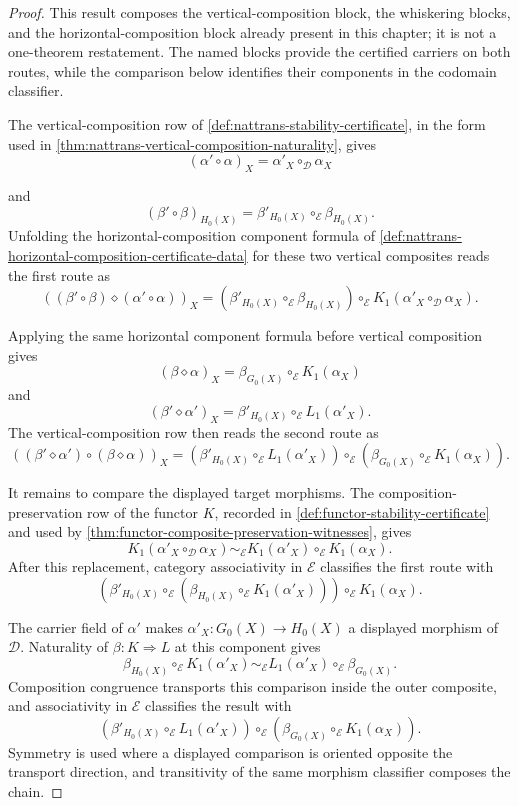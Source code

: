 \begin{proof}
This result composes the vertical-composition block, the whiskering blocks, and the horizontal-composition block already present in this chapter; it is not a one-theorem restatement. The named blocks provide the certified carriers on both routes, while the comparison below identifies their components in the codomain classifier.

The vertical-composition row of \autoref{def:nattrans-stability-certificate}, in the form used in \autoref{thm:nattrans-vertical-composition-naturality}, gives
$$
(\alpha'\circ\alpha)_X=\alpha'_X\circ_{\mathcal D}\alpha_X
$$

and
$$
(\beta'\circ\beta)_{H_0(X)}=\beta'_{H_0(X)}\circ_{\mathcal E}\beta_{H_0(X)}.
$$
Unfolding the horizontal-composition component formula of \autoref{def:nattrans-horizontal-composition-certificate-data} for these two vertical composites reads the first route as
$$
((\beta'\circ\beta)\diamond(\alpha'\circ\alpha))_X
=
(\beta'_{H_0(X)}\circ_{\mathcal E}\beta_{H_0(X)})\circ_{\mathcal E}K_1(\alpha'_X\circ_{\mathcal D}\alpha_X).
$$

Applying the same horizontal component formula before vertical composition gives
$$
(\beta\diamond\alpha)_X=\beta_{G_0(X)}\circ_{\mathcal E}K_1(\alpha_X)
$$
and
$$
(\beta'\diamond\alpha')_X=\beta'_{H_0(X)}\circ_{\mathcal E}L_1(\alpha'_X).
$$
The vertical-composition row then reads the second route as
$$
((\beta'\diamond\alpha')\circ(\beta\diamond\alpha))_X
=
(\beta'_{H_0(X)}\circ_{\mathcal E}L_1(\alpha'_X))\circ_{\mathcal E}(\beta_{G_0(X)}\circ_{\mathcal E}K_1(\alpha_X)).
$$

It remains to compare the displayed target morphisms. The composition-preservation row of the functor $K$, recorded in \autoref{def:functor-stability-certificate} and used by \autoref{thm:functor-composite-preservation-witnesses}, gives
$$
K_1(\alpha'_X\circ_{\mathcal D}\alpha_X)
\sim_{\mathcal E}
K_1(\alpha'_X)\circ_{\mathcal E}K_1(\alpha_X).
$$
After this replacement, category associativity in $\mathcal E$ classifies the first route with
$$
(\beta'_{H_0(X)}\circ_{\mathcal E}(\beta_{H_0(X)}\circ_{\mathcal E}K_1(\alpha'_X)))\circ_{\mathcal E}K_1(\alpha_X).
$$

The carrier field of $\alpha'$ makes $\alpha'_X:G_0(X)\to H_0(X)$ a displayed morphism of $\mathcal D$. Naturality of $\beta:K\Rightarrow L$ at this component gives
$$
\beta_{H_0(X)}\circ_{\mathcal E}K_1(\alpha'_X)
\sim_{\mathcal E}
L_1(\alpha'_X)\circ_{\mathcal E}\beta_{G_0(X)}.
$$
Composition congruence transports this comparison inside the outer composite, and associativity in $\mathcal E$ classifies the result with
$$
(\beta'_{H_0(X)}\circ_{\mathcal E}L_1(\alpha'_X))\circ_{\mathcal E}(\beta_{G_0(X)}\circ_{\mathcal E}K_1(\alpha_X)).
$$
Symmetry is used where a displayed comparison is oriented opposite the transport direction, and transitivity of the same morphism classifier composes the chain.


\end{proof}
